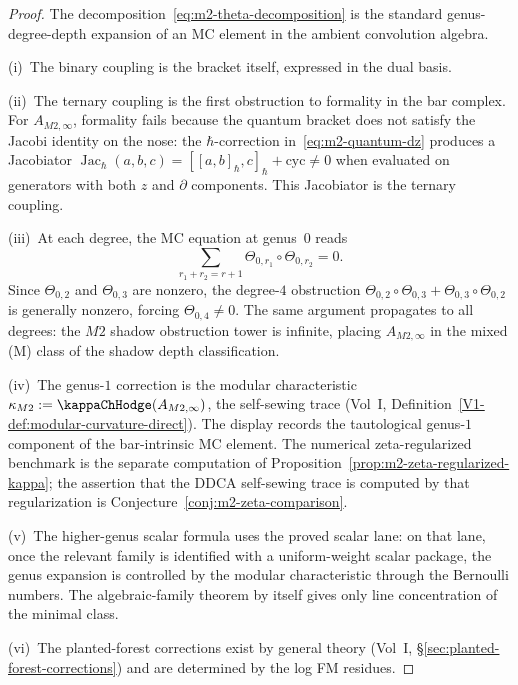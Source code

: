 \begin{proof}
The decomposition~\eqref{eq:m2-theta-decomposition} is the
standard genus-degree-depth expansion of an MC element in the
ambient convolution algebra.

(i)~The binary coupling is the bracket itself, expressed in the
dual basis.

(ii)~The ternary coupling is the first obstruction to formality
in the bar complex. For $A_{M2,\infty}$, formality fails because
the quantum bracket does not satisfy the Jacobi identity on the nose:
the $\hbar$-correction in~\eqref{eq:m2-quantum-dz} produces
a Jacobiator $\operatorname{Jac}_\hbar(a,b,c)
= [[a,b]_\hbar,c]_\hbar + \text{cyc} \neq 0$
when evaluated on generators with both $z$ and $\partial$
components. This Jacobiator is the ternary coupling.

(iii)~At each degree, the MC equation at genus~$0$ reads
\[
\sum_{r_1+r_2=r+1}\Theta_{0,r_1}\circ\Theta_{0,r_2} = 0.
\]
Since $\Theta_{0,2}$ and $\Theta_{0,3}$ are nonzero, the
degree-$4$ obstruction
$\Theta_{0,2}\circ\Theta_{0,3}+\Theta_{0,3}\circ\Theta_{0,2}$
is generally nonzero, forcing $\Theta_{0,4}\neq 0$. The same
argument propagates to all degrees: the $M2$ shadow obstruction tower is
infinite, placing $A_{M2,\infty}$ in the mixed (M) class of
the shadow depth classification.

(iv)~The genus-$1$ correction is the modular characteristic
$\kappa_{M2} := \kappaChHodge(A_{M2,\infty})$, the self-sewing trace
(Vol~I, Definition~\ref*{V1-def:modular-curvature-direct}).  The
display records the tautological genus-$1$ component of the
bar-intrinsic MC element.  The numerical zeta-regularized benchmark is
the separate computation of Proposition~\ref{prop:m2-zeta-regularized-kappa};
the assertion that the DDCA self-sewing trace is computed by that
regularization is Conjecture~\ref{conj:m2-zeta-comparison}.

(v)~The higher-genus scalar formula uses the proved scalar lane:
on that lane, once the relevant family is identified with a
uniform-weight scalar package, the genus expansion is controlled by
the modular characteristic through the Bernoulli numbers. The
algebraic-family theorem by itself gives only line concentration of
the minimal class.

(vi)~The planted-forest corrections exist by general theory
(Vol~I, \S\ref*{sec:planted-forest-corrections}) and are
determined by the log FM residues.
\end{proof}

